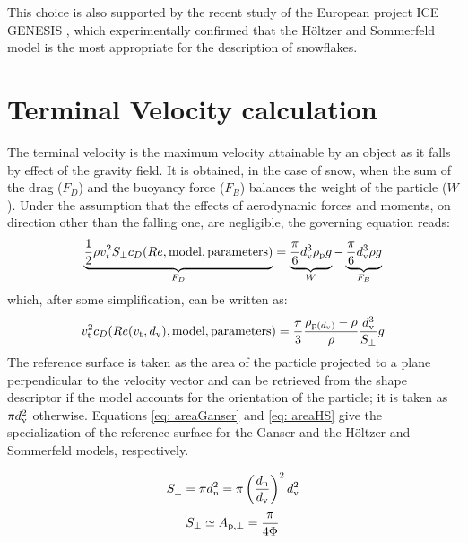 		This choice is also supported by the recent study of the European project ICE GENESIS , which experimentally confirmed that the H\"oltzer and Sommerfeld model is the most appropriate for the description of snowflakes. 
		
%		
		
	\section{Terminal Velocity calculation}
	\label{sec: terminalVelocity}
		The terminal velocity is the maximum velocity attainable by an object as it falls by effect of the gravity field. It is obtained, in the case of snow, when the sum of the drag ($ F_{D} $) and the buoyancy force ($ F_B $) balances the weight of the particle ($ W $). Under the assumption that the effects of aerodynamic forces and moments, on direction other than the falling one, are negligible, the governing equation reads:
		\begin{equation}
			\underbrace{\frac{1}{2} \rho v_t^2 S_{\perp} c_D(Re, \text{model}, \text{parameters})}_{F_{D}} = 
			\underbrace{\frac{\pi}{6} d_{\textup{v}}^3 \rho_{\textup{p}} g}_{W} - 
			\underbrace{\frac{\pi}{6} d_{\textup{v}}^3 \rho g}_{F_B}
			\label{eq: governing}
		\end{equation}
		which, after some simplification, can be written as:
		\begin{equation}
			v_{\textup{t}}^2 c_D(Re(v_{\textup{t}}, d_{\textup{v}}), \text{model}, \text{parameters}) = 
			\frac{\pi}{3} \dfrac{\rho_{\textup{p}(d_{\textup{v}})} - \rho}{\rho} \dfrac{d_{\textup{v}}^3}{S_{\perp}} g
			\label{eq: terminalVelocity}
		\end{equation}
		The reference surface is taken as the area of the particle projected to a plane perpendicular to the velocity vector and can be retrieved from the shape descriptor if the model accounts for the orientation of the particle; it is taken as $ \pi d_{\textup{v}}^2 $ otherwise. Equations \ref{eq: areaGanser} and \ref{eq: areaHS} give the specialization of the reference surface for the Ganser and the H\"oltzer and Sommerfeld models, respectively.
		\begin{multicols}{2}
			\begin{equation}
				S_{\perp} = \pi d_{\textup{n}}^2 = \pi \left( \frac{d_{\textup{n}}}{d_{\textup{v}}} \right)^2 d_{\textup{v}}^2
				\label{eq: areaGanser}
			\end{equation}\break
			\begin{equation}
				S_{\perp} \simeq A_{\textup{p}, \perp} = \dfrac{\pi}{4 \Phi}
				\label{eq: areaHS}
			\end{equation}
		\end{multicols}
		
